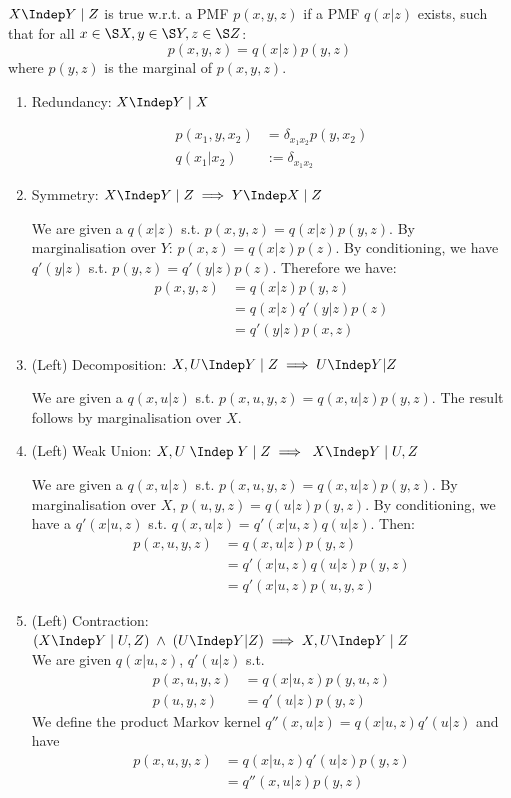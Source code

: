 \begin{gradedsolution}
  $X \Indep Y \; | \; Z$ is true w.r.t. a PMF $p(x, y, z)$ if a PMF $q(x|z)$ exists, such that for all $x \in \S X, y \in \S Y, z \in \S Z$:
\[
  p(x,y,z)=q(x|z)p(y,z)
\]
where $p(y,z)$ is the marginal of $p(x,y,z)$.
\begin{enumerate}
\item Redundancy: $X \Indep Y \;|\; X$

\begin{align*}
p(x_1,y,x_2)&=\delta_{x_1x_2}p(y, x_2)\\
q(x_1|x_2)&:=\delta_{x_1x_2}
\end{align*}

\item Symmetry: $X \Indep Y\; |\; Z \implies Y \Indep X\; |\; Z$ 

We are given a $q(x|z)$ s.t. $p(x,y,z)=q(x|z)p(y,z)$. By marginalisation over $Y$: $p(x, z)=q(x|z)p(z)$. By conditioning, we have $q'(y|z)$ s.t. $p(y,z)=q'(y|z)p(z)$. Therefore we have:
\begin{align*}
  p(x,y,z)
  &=q(x|z)p(y,z)\\
  &=q(x|z)q'(y|z)p(z)\\
  &=q'(y|z)p(x,z)
\end{align*}

\item (Left) Decomposition: $X, U \Indep Y \; | \; Z \implies U \Indep Y | Z\; $

We are given a $q(x,u|z)$ s.t. $p(x, u, y, z)=q(x, u|z)p(y, z)$.
The result follows by marginalisation over $X$.

\item (Left) Weak Union: $X,U \;\Indep \;  Y \; | \; Z \implies  \; X \Indep Y \; |\; U,Z $

We are given a $q(x,u|z)$ s.t. $p(x, u, y, z)=q(x, u|z)p(y, z)$. By marginalisation over $X$, $p(u, y, z)=q(u|z)p(y, z)$. By conditioning, we have a $q'(x|u,z)$ s.t. $q(x,u|z)=q'(x|u,z)q(u|z)$. Then:
\begin{align*}
  p(x,u,y,z)
  &=q(x,u|z)p(y,z) \\
  &=q'(x|u,z)q(u|z)p(y,z) \\
  &=q'(x|u,z)p(u,y,z)
\end{align*}

\item (Left) Contraction: $(X \Indep Y\; |\; U, Z) \; \land \; (U \Indep Y | Z) \implies X, U \Indep Y \; | \; Z$ \\

We are given $q(x|u,z)$, $q'(u|z)$ s.t.
\begin{align*}
p(x, u, y, z)&=q(x|u,z)p(y, u, z)\\
p(u, y, z)&=q'(u|z)p(y, z)
\end{align*}
We define the product Markov kernel $q''(x,u|z)=q(x|u,z)q'(u|z)$ and have
\begin{align*}
p(x, u, y, z)&=q(x|u,z)q'(u|z)p(y, z)\\
&=q''(x,u|z)p(y, z)
\end{align*}


\end{enumerate}
\end{gradedsolution}
